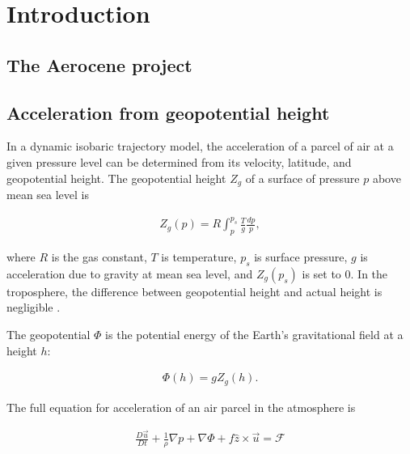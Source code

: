 \chapter{Introduction}

\section{The Aerocene project}

\section{Acceleration from geopotential height} \label{sec:acceleration}
In a dynamic isobaric trajectory model, the acceleration of a parcel of air at a given pressure level can be determined from its velocity, latitude, and geopotential height.
The geopotential height $Z_g$ of a surface of pressure $p$ above mean sea level is 

\begin{align}
    Z_g(p) = R \int_p^{p_s} \frac{T}{g} \frac{dp}{p},
\end{align}

where $R$ is the gas constant, $T$ is temperature, $p_s$ is surface pressure, $g$ is acceleration due to gravity at mean sea level, and $Z_g(p_s)$ is set to 0. 
In the troposphere, the difference between geopotential height and actual height is negligible \cite{marshall_atmosphere_2008}. 

The geopotential $\Phi$ is the potential energy of the Earth's gravitational field at a height $h$:

\begin{align}
    \Phi (h) = g Z_g (h) \label{eq:geopotential}.
\end{align}

The full equation for acceleration of an air parcel in the atmosphere is

\begin{align}
    \frac{D \vec{u}}{Dt} + \frac{1}{\rho} \nabla p + \nabla \Phi + f \hat{z} \times \vec{u} = \mathcal{F} \label{eq:full}
\end{align}

